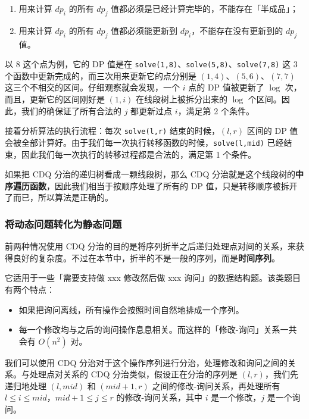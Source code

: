 \begin{enumerate}
    \item 用来计算 $dp_i$ 的所有 $dp_j$ 值都必须是已经计算完毕的，不能存在「半成品」；
    \item 用来计算 $dp_i$ 的所有 $dp_j$ 值都必须能更新到 $dp_i$，不能存在没有更新到的 $dp_j$ 值。
\end{enumerate}

以 $8$ 这个点为例，它的 DP 值是在 \texttt{solve(1,8)}、\texttt{solve(5,8)}、\texttt{solve(7,8)} 这 3 个函数中更新完成的，而三次用来更新它的点分别是 $(1,4)$、$(5,6)$、$(7,7)$ 这三个不相交的区间。仔细观察就会发现，一个 $i$ 点的 DP 值被更新了 $\log$ 次，而且，更新它的区间刚好是 $(1,i)$ 在线段树上被拆分出来的 $\log$ 个区间。因此，我们的确保证了所有合法的 $j$ 都更新过点 $i$，满足第 2 个条件。

接着分析算法的执行流程：每次 \texttt{solve(l,r)} 结束的时候，$(l,r)$ 区间的 DP 值会被全部计算好。由于我们每一次执行转移函数的时候，\texttt{solve(l,mid)} 已经结束，因此我们每一次执行的转移过程都是合法的，满足第 1 个条件。

如果把 CDQ 分治的递归树看成一颗线段树，那么 CDQ 分治就是这个线段树的\textbf{中序遍历函数}，因此我们相当于按顺序处理了所有的 DP 值，只是转移顺序被拆开了而已，所以算法是正确的。

\hrulefill

\subsubsection*{将动态问题转化为静态问题}

前两种情况使用 CDQ 分治的目的是将序列折半之后递归处理点对间的关系，来获得良好的复杂度。不过在本节中，折半的不是一般的序列，而是\textbf{时间序列}。

它适用于一些「需要支持做 xxx 修改然后做 xxx 询问」的数据结构题。该类题目有两个特点：

\begin{itemize}
    \item 如果把询问离线，所有操作会按照时间自然地排成一个序列。
    \item 每一个修改均与之后的询问操作息息相关。而这样的「修改-询问」关系一共会有 $O(n^2)$ 对。
\end{itemize}

我们可以使用 CDQ 分治对于这个操作序列进行分治，处理修改和询问之间的关系。与处理点对关系的 CDQ 分治类似，假设正在分治的序列是 $(l,r)$，我们先递归地处理 $(l,mid)$ 和 $(mid+1,r)$ 之间的修改-询问关系，再处理所有 $l \le i \le mid$，$mid+1 \le j \le r$ 的修改-询问关系，其中 $i$ 是一个修改，$j$ 是一个询问。

